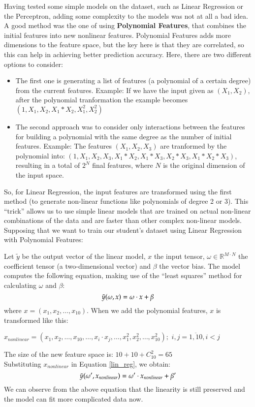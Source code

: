 Having tested some simple models on the dataset, such as Linear Regression or the 
Perceptron, adding some complexity to the models was not at all a bad idea. 
A good method was the one of using {\bf Polynomial Features}, that combines the 
initial features into new nonlinear features. Polynomial Features adds more 
dimensions to the feature space, but the key here is that they are correlated, 
so this can help in achieving better prediction accuracy. Here, there are two different 
options to consider:

\begin{itemize}
  \item The first one is generating a list of features (a polynomial of a certain 
  degree) from the current features. 
  Example: If we have the input given as $(X_1, X_2)$, after the polynomial 
  tranformation the example becomes $(1, X_1, X_2, X_1*X_2, X_1^2, X_2^2)$
  \item The second approach was to consider only interactions between the 
  features for building a polynomial with the same degree as the number of 
  initial features.
  Example: The features $(X_1, X_2, X_3)$ are tranformed by the polynomial 
  into: $(1, X_1, X_2, X_3, X_1*X_2, X_1*X_3, X_2*X_3, X_1*X_2*X_3)$, resulting 
  in a total of $2^{N}$ final features, where $N$ is the original dimension of 
  the input space.
\end{itemize}

So, for Linear Regression, the input features are transformed using the first 
method (to generate non-linear functions like polynomials of degree 2 or 3).
This ``trick'' allows us to use simple linear models that are trained on actual 
non-linear combinations of the data and are faster than other complex 
non-linear models.
Supposing that we want to train our student's dataset using Linear Regression 
with Polynomial Features: 

Let $\tilde{y}$ be the output vector of the linear model, $x$ the input tensor,
$\omega \in \mathbb{R}^{M \cdot N}$ the coefficient tensor (a two-dimensional vector) 
and $\beta$ the vector bias. The model computes the following equation, making use of 
the ``least squares'' method for calculating 
$\omega$ and $\beta$:
\begin{equation}
\label{lin_reg}
\centering
\tilde{y}(\omega, x) = \omega \cdot x + \beta
\end{equation}
where $x = (x_1,x_2,\dots,x_{10}).$
When we add the polynomial features, $x$ is transformed like this:
\begin{center}
$x_{nonlinear} = (x_1,x_2,\dots,x_{10},\dots,x_i \cdot x_j,\dots,x_1^2,x_2^2,\dots,x_{10}^2);$ 
 $i, j = \overline{1,10}, i < j$
\end{center}
The size of the new feature space is: $10+10+C_{10}^2=65$ \\
Substituting $x_{nonlinear}$ in Equation \ref{lin_reg}, we obtain:
\begin{equation}
\centering
\tilde{y}(\omega', x_{nonlinear}) = \omega' \cdot x_{nonlinear} + \beta'
\end{equation}
We can observe from the above equation that the linearity is still preserved and the 
model can fit more complicated data now.

